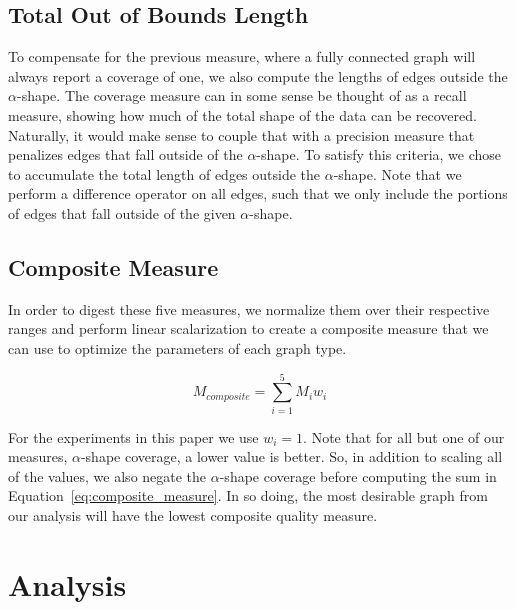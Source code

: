 \subsection{Total Out of Bounds Length}
%
To compensate for the previous measure, where a fully connected graph will always report a coverage of one, we also compute the lengths of edges outside the $\alpha$-shape.
%
%
The coverage measure can in some sense be thought of as a recall measure, showing how much of the total shape of the data can be recovered.
%
Naturally, it would make sense to couple that with a precision measure that penalizes edges that fall outside of the $\alpha$-shape.
%
To satisfy this criteria, we chose to accumulate the total length of edges outside the $\alpha$-shape.
%
Note that we perform a difference operator on all edges, such that we only include the portions of edges that fall outside of the given $\alpha$-shape.

\subsection{Composite Measure}
In order to digest these five measures, we normalize them over their respective ranges and perform linear scalarization to create a composite measure that we can use to optimize the parameters of each graph type.

\begin{equation}
    M_{composite} = \sum_{i=1}^5 M_iw_i
\label{eq:composite_measure}
\end{equation}

For the experiments in this paper we use $w_i=1$.
%
Note that for all but one of our measures, $\alpha$-shape coverage, a lower value is better.
%
So, in addition to scaling all of the values, we also negate the $\alpha$-shape coverage before computing the sum in Equation~\ref{eq:composite_measure}.
%
In so doing, the most desirable graph from our analysis will have the lowest composite quality measure.

\section{Analysis}

